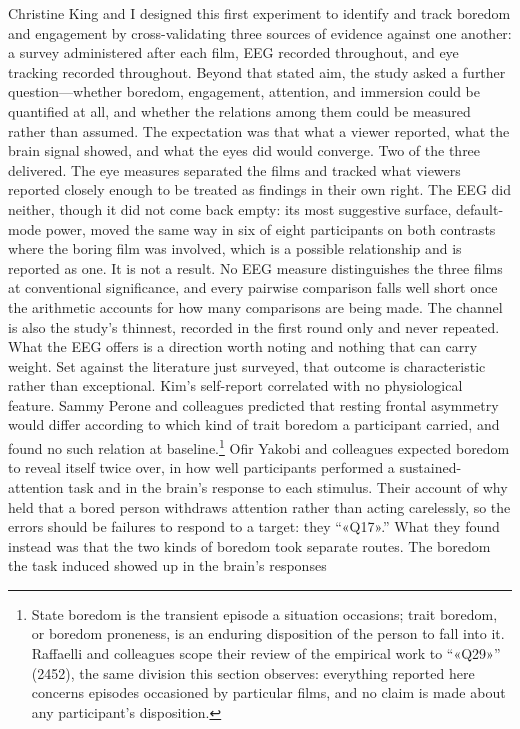 Christine King and I designed this first experiment to identify and track boredom and
engagement by cross-validating three sources of evidence against one another: a survey
administered after each film, EEG recorded throughout, and eye tracking recorded throughout.
Beyond that stated aim, the study asked a further question---whether boredom, engagement,
attention, and immersion could be quantified at all, and whether the relations among them
could be measured rather than assumed. The expectation was that what a viewer reported, what
the brain signal showed, and what the eyes did would converge. Two of the three delivered. The eye measures separated the films and
tracked what viewers reported closely enough to be treated as findings in their own right. The
EEG did neither, though it did not come back empty: its most suggestive surface, default-mode
power, moved the same way in six of eight participants on both contrasts where the boring film
was involved, which is a possible relationship and is reported as one. It is not a result. No
EEG measure distinguishes the three films at conventional significance, and every pairwise
comparison falls well short once the arithmetic accounts for how many comparisons are being
made. The channel is also the study's thinnest, recorded in the first round only and never
repeated. What the EEG offers is a direction worth noting and nothing that can carry weight.
Set against the literature just surveyed, that outcome is characteristic rather than
exceptional. Kim's self-report correlated with no
physiological feature. Sammy
Perone and colleagues predicted that resting frontal asymmetry would differ according to which
kind of trait boredom a participant carried, and found no such relation at baseline.\footnote{
State boredom is the transient episode a situation occasions; trait boredom, or boredom
proneness, is an enduring disposition of the person to fall into it. Raffaelli and colleagues
scope their review of the empirical work to ``«Q29»'' (2452), the same division this section
observes: everything reported here concerns episodes occasioned by particular films, and no
claim is made about any participant's disposition.} Ofir Yakobi and colleagues expected boredom
to reveal itself twice over, in how well participants performed a sustained-attention task and
in the brain's response to each stimulus. Their account of why held that a bored person
withdraws attention rather than acting carelessly, so the errors should be failures to respond
to a target: they ``«Q17».'' What they found instead was that the two kinds of
boredom took separate routes. The boredom the task induced showed up in the brain's responses
